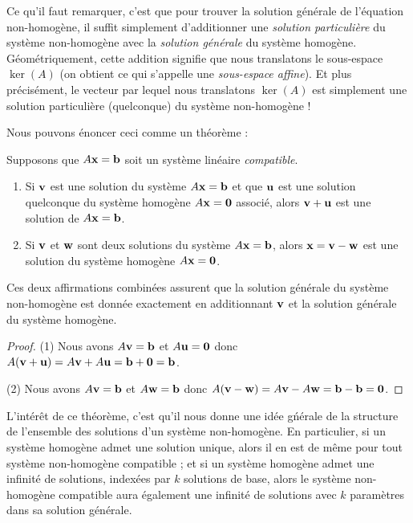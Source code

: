 Ce qu'il faut remarquer, c'est que pour trouver la solution générale de l'équation non-homogène, il suffit simplement d'additionner une \emph{solution particulière} du système non-homogène avec la \emph{solution générale} du système homogène.  Géométriquement, cette addition signifie que nous translatons le sous-espace $\ker(A)$ (on obtient ce qui s'appelle une \emph{sous-espace affine}).  Et plus précisément, le vecteur par lequel nous translatons $\ker(A)$ est simplement une solution particulière (quelconque) du système non-homog\`ene !


Nous pouvons énoncer ceci comme un théorème :

\begin{theorem}  

Supposons que $A\mathbf{x}=\mathbf{b}$ soit un système linéaire \emph{compatible}. 
\begin{enumerate}
\item Si $\mathbf{v}$ est une solution du système $A\mathbf{x} = \mathbf{b}$  et que $\mathbf{u}$ est une solution quelconque du système homogène $A\mathbf{x} = \mathbf{0}$ associé,
alors $\mathbf{v} + \mathbf{u}$ est une solution de $A\mathbf{x} = \mathbf{b}$.
\item Si $\mathbf{v}$ et $\mathbf{w}$ sont deux solutions du système $A\mathbf{x} = \mathbf{b}$, alors $\mathbf{x} = \mathbf{v}-\mathbf{w}$ est une solution du système homogène $A\mathbf{x} = \mathbf{0}$.
\end{enumerate}
Ces deux affirmations combinées assurent que la solution générale du système non-homogène est donnée exactement en additionnant $\mathbf{v}$ et la solution générale du
système homogène.
\end{theorem}

\begin{proof}

(1) Nous avons $A\mathbf{v} = \mathbf{b}$ et $A\mathbf{u} = \mathbf{0}$ donc $A(\mathbf{v}+\mathbf{u}) = A\mathbf{v} + A\mathbf{u} = \mathbf{b} + \mathbf{0} = \mathbf{b}$.

(2) Nous avons $A\mathbf{v} = \mathbf{b}$ et $A\mathbf{w} = \mathbf{b}$ donc $A(\mathbf{v} - \mathbf{w}) = A\mathbf{v} - A\mathbf{w} = \mathbf{b} - \mathbf{b} = \mathbf{0}$.
\end{proof}

L'intérêt de ce théorème, c'est qu'il nous donne une id\'ee g\'n\'erale de la structure de l'ensemble des solutions d'un système non-homogène.
En particulier, si un système homogène admet une solution unique, alors il en est de même pour tout système non-homogène compatible ; et si un système homogène admet une infinité de solutions, indexées par $k$ solutions de base, alors le système non-homogène compatible aura également une infinité de solutions avec $k$ paramètres dans sa solution g\'en\'erale.\\

